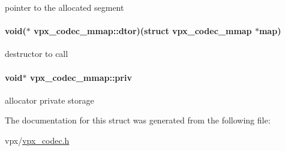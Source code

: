 pointer to the allocated segment \hypertarget{structvpx__codec__mmap_a39476b4d60e41d0867e0966f09dc1e45}{
\paragraph[{dtor}]{\setlength{\rightskip}{0pt plus 5cm}void($\ast$ vpx\+\_\+codec\+\_\+mmap\+::dtor)(struct {\bf vpx\+\_\+codec\+\_\+mmap} $\ast$map)}}\label{structvpx__codec__mmap_a39476b4d60e41d0867e0966f09dc1e45}
destructor to call \hypertarget{structvpx__codec__mmap_ac2be21bb5e6d94332fff9c5f1263224f}{
\paragraph[{priv}]{\setlength{\rightskip}{0pt plus 5cm}void$\ast$ vpx\+\_\+codec\+\_\+mmap\+::priv}}\label{structvpx__codec__mmap_ac2be21bb5e6d94332fff9c5f1263224f}
allocator private storage 

The documentation for this struct was generated from the following file\+:\begin{DoxyCompactItemize}
\item 
vpx/\hyperlink{vpx__codec_8h}{vpx\+\_\+codec.\+h}\end{DoxyCompactItemize}
